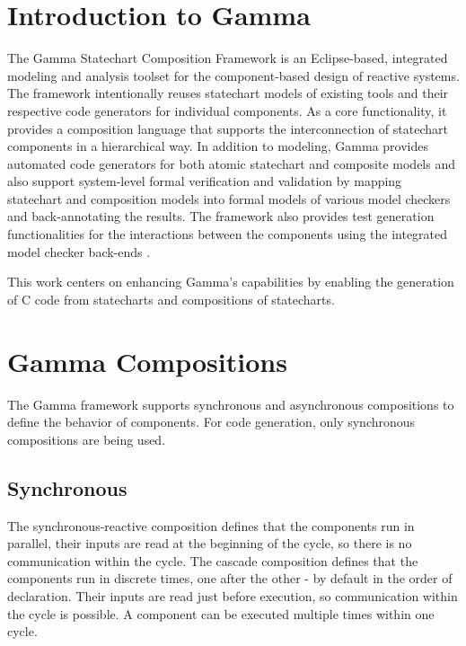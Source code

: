 \newpage

\section{Introduction to Gamma}

The Gamma Statechart Composition Framework \cite{Gamma} is an Eclipse-based, integrated modeling and analysis toolset for the component-based design of reactive systems. The framework intentionally reuses statechart models of existing tools and their respective code generators for individual components. As a core functionality, it provides a composition language that supports the interconnection of statechart components in a hierarchical way. In addition to modeling, Gamma provides automated code generators for both atomic statechart and composite models and also support system-level formal verification and validation by mapping statechart and composition models into formal models of various model checkers and back-annotating the results. The framework also provides test generation functionalities for the interactions between the components using the integrated model checker back-ends \cite{CPS}.

This work centers on enhancing Gamma's capabilities by enabling the generation of C code from statecharts and compositions of statecharts.

\section{Gamma Compositions}

The Gamma framework supports synchronous and asynchronous compositions to define the behavior of components. For code generation, only synchronous compositions are being used.

\subsection{Synchronous}

The synchronous-reactive composition defines that the components run in parallel, their inputs are read at the beginning of the cycle, so there is no communication within the cycle. The cascade composition defines that the components run in discrete times, one after the other - by default in the order of declaration. Their inputs are read just before execution, so communication within the cycle is possible. A component can be executed multiple times within one cycle.

